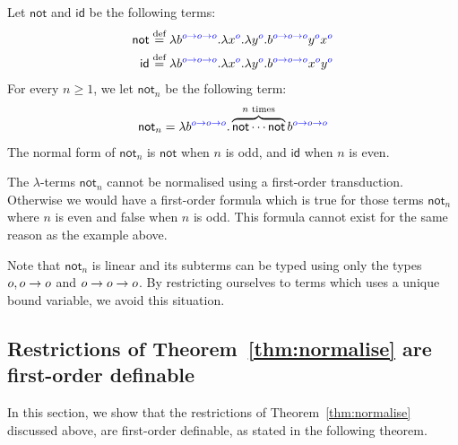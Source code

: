 \begin{example}\label{ex:tito}
Let $\mathsf{not}$ and $\mathsf{id}$ be the following terms:
\begin{align*}
\mathsf{not} \stackrel{\text{def}}= \lambda {b}^{{\color{blue}o \to o \to o}} . \lambda {x}^{{\color{blue}o}} . \lambda {y}^{{\color{blue}o}} . {b}^{{\color{blue}o \to o \to o}} {y}^{{\color{blue}o}} {x}^{{\color{blue}o}}  \\
 \mathsf{id} \stackrel{\text{def}}= \lambda {b}^{{\color{blue}o \to o \to o}}. \lambda {x}^{{\color{blue}o}}. \lambda {y}^{{\color{blue}o}}. {b}^{{\color{blue}o \to o \to o}} {x}^{{\color{blue}o}} {y}^{{\color{blue}o}}
\end{align*}
For every $n\geq 1$, we let $\mathsf{not}_n$ be the following term:
\begin{align*}
\mathsf{not}_n = \lambda {b}^{{\color{blue}o \to o \to o}}. \overbrace{\mathsf{not} \cdots \mathsf{not}}^{\text{$n$ times}} {b}^{{\color{blue}o \to o \to o}}
\end{align*}
The normal form of $\mathsf{not}_n$ is $\mathsf{not}$ when $n$ is odd, and  $\mathsf{id}$ when $n$ is even. 

The $\lambda$-terms $\mathsf{not}_n$ cannot be normalised using
a first-order transduction. Otherwise we would have a first-order formula which is true for those terms $\mathsf{not}_n$ where $n$ is even and false when $n$ is odd. This formula cannot exist for the same reason as the example above.  

Note that $\mathsf{not}_n$ is linear and its subterms can be typed using only the types $o, o\to o$ and ${o \to o \to o}$. By restricting ourselves to terms which uses a unique bound variable, we avoid this situation. 
\end{example}
\subsection{Restrictions of Theorem~\ref{thm:normalise} are first-order definable} \label{sec:restrictions-are-fo}

In this section, we show that the restrictions of Theorem~\ref{thm:normalise} discussed above, are first-order definable, as stated in the following theorem.

